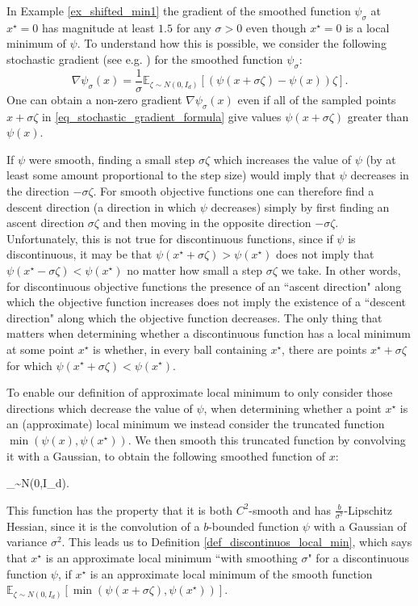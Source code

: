\documentclass[11pt,letterpaper]{article}
\def \be{\begin{equs}}
\def \ee{\end{equs}}
\begin{document}
  
  \noindent
  In Example \ref{ex_shifted_min1} the gradient of the smoothed function $\psi_\sigma$ at $x^\star=0$ has magnitude at least $1.5$ for any $\sigma>0$ even though $x^\star=0$ is a local minimum of $\psi$. 
   To understand how this is possible, we consider the following stochastic gradient (see e.g. \cite{flaxman2005online}) for the smoothed function $\psi_\sigma$:
\begin{equation} \label{eq_stochastic_gradient_formula}
\nabla \psi_\sigma(x) =   \frac{1}{\sigma} \mathbb{E}_{\zeta \sim N(0,I_d)}[(\psi(x + \sigma \zeta) - \psi(x)) \zeta].
\end{equation}
 One can obtain a non-zero gradient $\nabla \psi_\sigma(x)$ even if all of the sampled points $x + \sigma \zeta$ in \eqref{eq_stochastic_gradient_formula} give values $\psi(x + \sigma \zeta)$ greater than $\psi(x)$.
 
 If $\psi$ were smooth, finding a small step $\sigma \zeta$ which increases the value of $\psi$ (by at least some amount proportional to the step size) would imply that $\psi$ decreases in the direction $-\sigma \zeta$.
For smooth objective functions one can therefore find a descent direction (a direction in which $\psi$ decreases) simply by first finding an ascent direction $\sigma \zeta$ and then moving in the opposite direction $-\sigma \zeta$.
 Unfortunately, this is not true for discontinuous functions, since if $\psi$ is discontinuous, it may be that $\psi(x^\star + \sigma \zeta) > \psi(x^\star)$ does not imply that $\psi(x^\star - \sigma \zeta) < \psi(x^\star)$ no matter how small a step $\sigma \zeta$ we take. 
  In other words, for discontinuous objective functions the presence of an ``ascent direction" along which the objective function increases does not imply the existence of a ``descent direction" along which the objective function decreases.
  The only thing that matters when determining whether a discontinuous function has a local minimum at some point $x^\star$ is whether, in every ball containing $x^\star$, there are points $x^\star + \sigma \zeta$ for which  $\psi(x^\star + \sigma \zeta) < \psi(x^\star)$.
  
  To enable our definition of approximate local minimum to only consider those directions which decrease the value of $\psi$, when determining whether a point $x^\star$ is an (approximate) local minimum we instead consider the truncated function $\min(\psi(x),  \psi(x^\star))$.
 We then smooth this truncated function by convolving it with a Gaussian, to obtain the following smoothed function of $x$:
  \be
{}_{\zeta \sim N(0,I_d)}.
  \ee
  This function has the property that it is both $C^2$-smooth and has $\frac{b}{\sigma^{7}}$-Lipschitz Hessian, since it is the convolution of a $b$-bounded function $\psi$ with a Gaussian of variance $\sigma^2$. 
  This leads us to Definition \ref{def_discontinuos_local_min}, which says that $x^\star$ is an approximate local minimum ``with smoothing $\sigma$" for a discontinuous function $\psi$, if $x^\star$ is an approximate local minimum of the smooth function $\mathbb{E}_{\zeta \sim N(0,I_d)}\left [\min(\psi(x  + \sigma \zeta),  \psi(x^\star)) \right]$.
\end{document}

